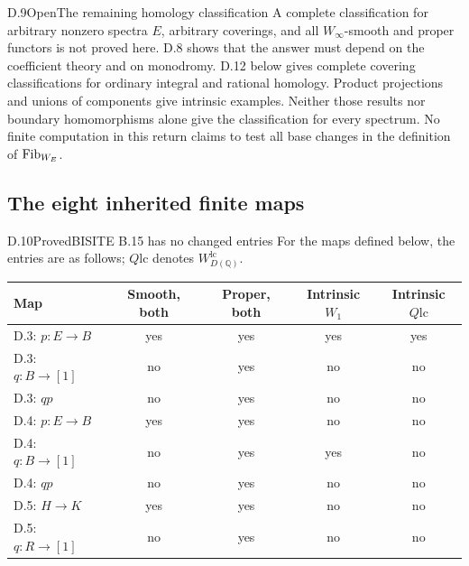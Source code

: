 \begin{claim}{D.9}{Open}{The remaining homology classification}
A complete classification for arbitrary nonzero spectra $E$, arbitrary coverings, and all $W_\infty$-smooth and proper functors is not proved here. D.8 shows that the answer must depend on the coefficient theory and on monodromy. D.12 below gives complete covering classifications for ordinary integral and rational homology. Product projections and unions of components give intrinsic examples. Neither those results nor boundary homomorphisms alone give the classification for every spectrum. No finite computation in this return claims to test all base changes in the definition of $\mathrm{Fib}_{W_E}$.
\end{claim}

\subsection{The eight inherited finite maps}
\begin{claim}{D.10}{Proved}{BISITE B.15 has no changed entries}
For the maps defined below, the entries are as follows; $Q\mathrm{lc}$ denotes $W_{D(\mathbb Q)}^{\mathrm{lc}}$.
\begin{center}\begin{tabular}{lcccc}
\toprule Map & Smooth, both & Proper, both & Intrinsic $W_1$ & Intrinsic $Q\mathrm{lc}$\\\midrule
D.3: $p:E\to B$ & yes&yes&yes&yes\\
D.3: $q:B\to[1]$ & no&yes&no&no\\
D.3: $qp$ & no&yes&no&no\\
D.4: $p:E\to B$ & yes&yes&no&no\\
D.4: $q:B\to[1]$ & no&yes&yes&no\\
D.4: $qp$ & no&yes&no&no\\
D.5: $H\to K$ & yes&yes&no&no\\
D.5: $q:R\to[1]$ & no&yes&no&no\\\bottomrule
\end{tabular}\end{center}
\end{claim}
